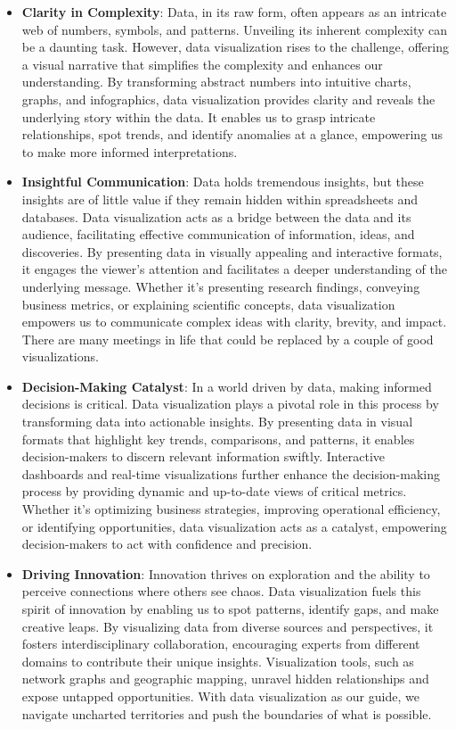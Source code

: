 \documentclass[10pt]{extarticle}
\newcommand{\<}{\langle}
\renewcommand{\>}{\rangle}
\theoremstyle{mystyle}{\newtheorem*{remark}{Remark}}
\theoremstyle{mystyle}{\newtheorem*{remarks}{Remarks}}
\theoremstyle{mystyle}{\newtheorem*{example}{Example}}
\theoremstyle{mystyle}{\newtheorem*{examples}{Examples}}
\theoremstyle{definition}{\newtheorem*{exercise}{Exercise}}
\theoremstyle{warn}
\begin{document}
\begin{itemize}
\item \textbf{Clarity in Complexity}:
Data, in its raw form, often appears as an intricate web of numbers, symbols, and patterns. Unveiling its inherent complexity can be a daunting task. However, data visualization rises to the challenge, offering a visual narrative that simplifies the complexity and enhances our understanding. By transforming abstract numbers into intuitive charts, graphs, and infographics, data visualization provides clarity and reveals the underlying story within the data. It enables us to grasp intricate relationships, spot trends, and identify anomalies at a glance, empowering us to make more informed interpretations.
\item \textbf{Insightful Communication}:
Data holds tremendous insights, but these insights are of little value if they remain hidden within spreadsheets and databases. Data visualization acts as a bridge between the data and its audience, facilitating effective communication of information, ideas, and discoveries. By presenting data in visually appealing and interactive formats, it engages the viewer's attention and facilitates a deeper understanding of the underlying message. Whether it's presenting research findings, conveying business metrics, or explaining scientific concepts, data visualization empowers us to communicate complex ideas with clarity, brevity, and impact. There are many meetings in life that could be replaced by a couple of good visualizations.
\item \textbf{Decision-Making Catalyst}:
In a world driven by data, making informed decisions is critical. Data visualization plays a pivotal role in this process by transforming data into actionable insights. By presenting data in visual formats that highlight key trends, comparisons, and patterns, it enables decision-makers to discern relevant information swiftly. Interactive dashboards and real-time visualizations further enhance the decision-making process by providing dynamic and up-to-date views of critical metrics. Whether it's optimizing business strategies, improving operational efficiency, or identifying opportunities, data visualization acts as a catalyst, empowering decision-makers to act with confidence and precision.
\item \textbf{Driving Innovation}:
Innovation thrives on exploration and the ability to perceive connections where others see chaos. Data visualization fuels this spirit of innovation by enabling us to spot patterns, identify gaps, and make creative leaps. By visualizing data from diverse sources and perspectives, it fosters interdisciplinary collaboration, encouraging experts from different domains to contribute their unique insights. Visualization tools, such as network graphs and geographic mapping, unravel hidden relationships and expose untapped opportunities. With data visualization as our guide, we navigate uncharted territories and push the boundaries of what is possible.
\end{itemize}
\end{document}
